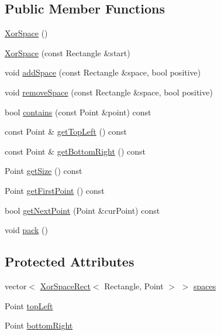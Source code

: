 \subsection*{Public Member Functions}
\begin{CompactItemize}
\item 
\hyperlink{class_j_g_t_l_1_1_xor_space_ad236c36d98b3fbf0d592ea1a524c34d}{Xor\-Space} ()
\item 
\hyperlink{class_j_g_t_l_1_1_xor_space_7ba86691f975e9e55e71ff94e46b7855}{Xor\-Space} (const Rectangle \&start)
\item 
void \hyperlink{class_j_g_t_l_1_1_xor_space_0f5b4faaaf03b9c7f85302125e2e834b}{add\-Space} (const Rectangle \&space, bool positive)
\item 
void \hyperlink{class_j_g_t_l_1_1_xor_space_ade3a68cc488df5f40a33df407887c2f}{remove\-Space} (const Rectangle \&space, bool positive)
\item 
bool \hyperlink{class_j_g_t_l_1_1_xor_space_327d98abef98ac5263a081a96cdc12ec}{contains} (const Point \&point) const 
\item 
const Point \& \hyperlink{class_j_g_t_l_1_1_xor_space_cb61e4508a4df0ab8dc83db8ce75140a}{get\-Top\-Left} () const
\item 
const Point \& \hyperlink{class_j_g_t_l_1_1_xor_space_20f62e7360534b0d7f9945acc99627d1}{get\-Bottom\-Right} () const
\item 
Point \hyperlink{class_j_g_t_l_1_1_xor_space_497ef0f83c9d2b6cdc10c4b297fd6e4f}{get\-Size} () const
\item 
Point \hyperlink{class_j_g_t_l_1_1_xor_space_fc844c1202940bc5340cf01a4431cbab}{get\-First\-Point} () const
\item 
bool \hyperlink{class_j_g_t_l_1_1_xor_space_88d290e087366c43f48ba39f3df78931}{get\-Next\-Point} (Point \&cur\-Point) const 
\item 
void \hyperlink{class_j_g_t_l_1_1_xor_space_a699867cb9debc04136fbbc8ccc4ff6f}{pack} ()
\end{CompactItemize}
\subsection*{Protected Attributes}
\begin{CompactItemize}
\item 
vector$<$ \hyperlink{class_j_g_t_l_1_1_xor_space_rect}{Xor\-Space\-Rect}$<$ Rectangle, Point $>$ $>$ \hyperlink{class_j_g_t_l_1_1_xor_space_107013005de6d1b3b7c5e6067b2054c5}{spaces}
\item 
Point \hyperlink{class_j_g_t_l_1_1_xor_space_9220f06140cf547c2521372da2d97f80}{top\-Left}
\item 
Point \hyperlink{class_j_g_t_l_1_1_xor_space_e76eebb329d0056211ff1c0caee42364}{bottom\-Right}
\end{CompactItemize}


